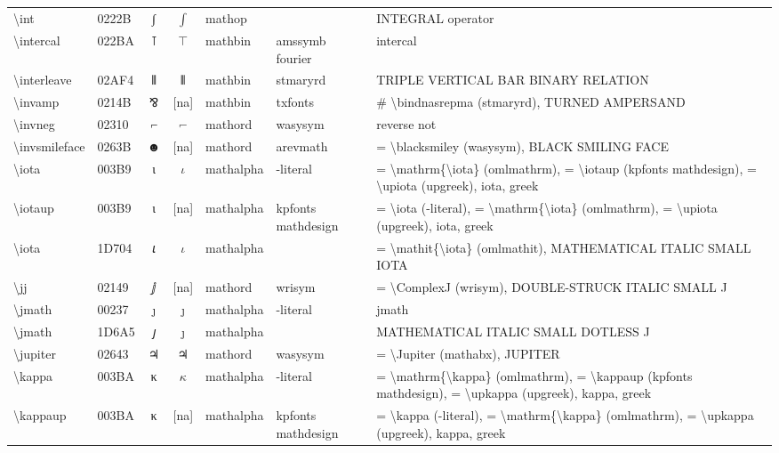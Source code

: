 \documentclass[a4paper,landscape]{article}
\begin{document}
\begin{longtable}{llcclll}
\textbackslash{}int & 0222B & ∫ & $\int$ & mathop &  & INTEGRAL operator \\
\textbackslash{}intercal & 022BA & ⊺ & $\intercal$ & mathbin & amssymb fourier & intercal \\
\textbackslash{}interleave & 02AF4 & ⫴ & $\interleave$ & mathbin & stmaryrd & TRIPLE VERTICAL BAR BINARY RELATION \\
\textbackslash{}invamp & 0214B & ⅋ & [na] & mathbin & txfonts & \# \textbackslash{}bindnasrepma (stmaryrd), TURNED AMPERSAND \\
\textbackslash{}invneg & 02310 & ⌐ & $\invneg$ & mathord & wasysym & reverse not \\
\textbackslash{}invsmileface & 0263B & ☻ & [na] & mathord & arevmath & = \textbackslash{}blacksmiley (wasysym),  BLACK SMILING FACE \\
\textbackslash{}iota & 003B9 & ι & $\iota$ & mathalpha & -literal & = \textbackslash{}mathrm\{\textbackslash{}iota\} (omlmathrm), = \textbackslash{}iotaup (kpfonts mathdesign), = \textbackslash{}upiota (upgreek), iota, greek \\
\textbackslash{}iotaup & 003B9 & ι & [na] & mathalpha & kpfonts mathdesign & = \textbackslash{}iota (-literal), = \textbackslash{}mathrm\{\textbackslash{}iota\} (omlmathrm),  = \textbackslash{}upiota (upgreek),  iota,  greek \\
\textbackslash{}iota & 1D704 & 𝜄 & $\iota$ & mathalpha &  & = \textbackslash{}mathit\{\textbackslash{}iota\} (omlmathit), MATHEMATICAL ITALIC SMALL IOTA \\
\textbackslash{}jj & 02149 & ⅉ & [na] & mathord & wrisym & = \textbackslash{}ComplexJ (wrisym),  DOUBLE-STRUCK ITALIC SMALL J \\
\textbackslash{}jmath & 00237 & ȷ & $\jmath$ & mathalpha & -literal & jmath \\
\textbackslash{}jmath & 1D6A5 & 𝚥 & $\jmath$ & mathalpha &  & MATHEMATICAL ITALIC SMALL DOTLESS J \\
\textbackslash{}jupiter & 02643 & \textsf ♃ & $\jupiter$ & mathord & wasysym & = \textbackslash{}Jupiter (mathabx), JUPITER \\
\textbackslash{}kappa & 003BA & κ & $\kappa$ & mathalpha & -literal & = \textbackslash{}mathrm\{\textbackslash{}kappa\} (omlmathrm), = \textbackslash{}kappaup (kpfonts mathdesign), = \textbackslash{}upkappa (upgreek), kappa, greek \\
\textbackslash{}kappaup & 003BA & κ & [na] & mathalpha & kpfonts mathdesign & = \textbackslash{}kappa (-literal), = \textbackslash{}mathrm\{\textbackslash{}kappa\} (omlmathrm),  = \textbackslash{}upkappa (upgreek),  kappa,  greek \\

\end{longtable}
\end{document}
